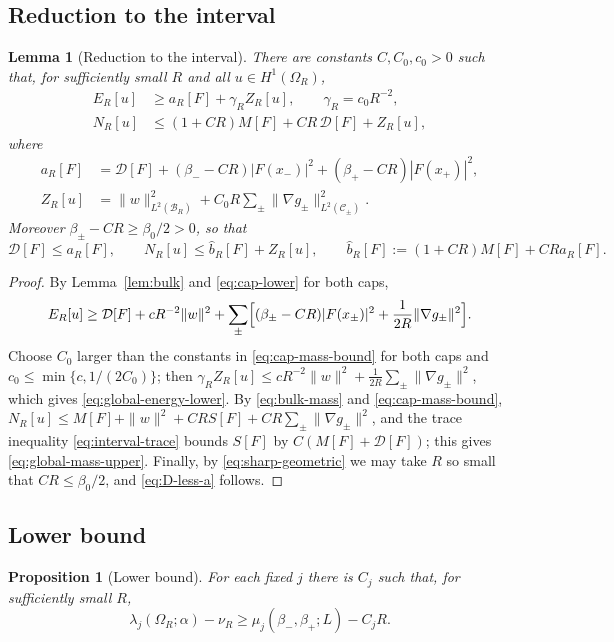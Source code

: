 \documentclass[11pt,a4paper]{article}
\numberwithin{equation}{section}
\theoremstyle{paperplain}
\newtheorem{lemma}[theorem]{Lemma}
\newtheorem{proposition}[theorem]{Proposition}
\theoremstyle{remark}
\newcommand{\C}{\mathcal{C}}
\newcommand{\B}{\mathcal{B}}
\begin{document}
\subsection{Reduction to the interval}
\begin{lemma}[Reduction to the interval]\label{lem:reduction}
There are constants $C,C_0,c_0>0$ such that, for sufficiently small $R$ and
all $u\in H^1(\Omega_R)$,
\begin{align}
 E_R[u]&\ge a_R[F]+\gamma_R Z_R[u],\qquad \gamma_R=c_0R^{-2},
 \label{eq:global-energy-lower}\\
 N_R[u]&\le(1+CR)M[F]+CR\,\mathcal D[F]+Z_R[u],
 \label{eq:global-mass-upper}
\end{align}
where
\begin{align}
 a_R[F]&=\mathcal D[F]+(\beta_--CR)|F(x_-)|^2+(\beta_+-CR)|F(x_+)|^2,\label{eq:a-R}\\
 Z_R[u]&=\|w\|_{L^2(\B_R)}^2+C_0R\sum_{\pm}\|\nabla g_\pm\|_{L^2(\C_\pm)}^2 .\label{eq:Z-definition}
\end{align}
Moreover $\beta_\pm-CR\ge\beta_0/2>0$, so that
\begin{equation}\label{eq:D-less-a}
 \mathcal D[F]\le a_R[F],\qquad
 N_R[u]\le\widehat b_R[F]+Z_R[u],\qquad
 \widehat b_R[F]:=(1+CR)M[F]+CRa_R[F].
\end{equation}
\end{lemma}

\begin{proof}
By Lemma~\ref{lem:bulk} and \eqref{eq:cap-lower} for both caps,
\[
 E_R[u]\ge\mathcal D[F]+cR^{-2}\|w\|^2
 +\sum_\pm\Bigl[(\beta_\pm-CR)|F(x_\pm)|^2+\frac1{2R}\|\nabla g_\pm\|^2\Bigr].
\]
Choose $C_0$ larger than the constants in \eqref{eq:cap-mass-bound} for both
caps and $c_0\le\min\{c,1/(2C_0)\}$; then
$\gamma_RZ_R[u]\le cR^{-2}\|w\|^2+\frac1{2R}\sum_\pm\|\nabla g_\pm\|^2$, which
gives \eqref{eq:global-energy-lower}. By \eqref{eq:bulk-mass} and
\eqref{eq:cap-mass-bound},
$N_R[u]\le M[F]+\|w\|^2+CRS[F]+CR\sum_\pm\|\nabla g_\pm\|^2$, and the trace
inequality \eqref{eq:interval-trace} bounds $S[F]$ by
$C(M[F]+\mathcal D[F])$; this gives \eqref{eq:global-mass-upper}. Finally,
by \eqref{eq:sharp-geometric} we may take $R$ so small that
$CR\le\beta_0/2$, and \eqref{eq:D-less-a} follows.
\end{proof}

\subsection{Lower bound}
\begin{proposition}[Lower bound]\label{prop:lower}
For each fixed $j$ there is $C_j$ such that, for sufficiently small $R$,
\[
 \lambda_j(\Omega_R;\alpha)-\nu_R\ge\mu_j(\beta_-,\beta_+;L)-C_jR.
\]
\end{proposition}
\end{document}

